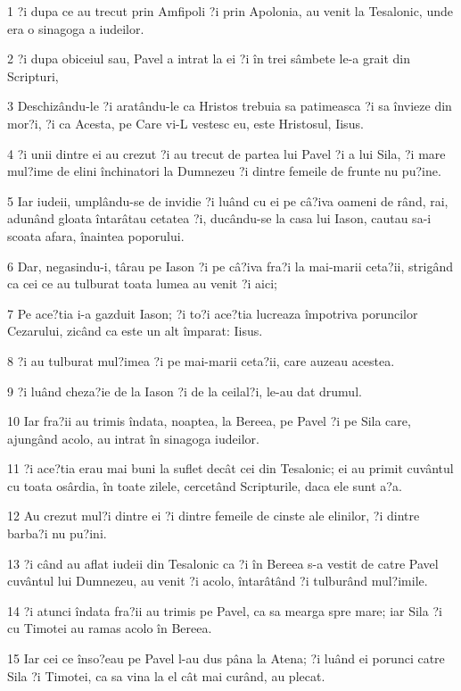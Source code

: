 \par 1 ?i dupa ce au trecut prin Amfipoli ?i prin Apolonia, au venit la Tesalonic, unde era o sinagoga a iudeilor.
\par 2 ?i dupa obiceiul sau, Pavel a intrat la ei ?i în trei sâmbete le-a grait din Scripturi,
\par 3 Deschizându-le ?i aratându-le ca Hristos trebuia sa patimeasca ?i sa învieze din mor?i, ?i ca Acesta, pe Care vi-L vestesc eu, este Hristosul, Iisus.
\par 4 ?i unii dintre ei au crezut ?i au trecut de partea lui Pavel ?i a lui Sila, ?i mare mul?ime de elini închinatori la Dumnezeu ?i dintre femeile de frunte nu pu?ine.
\par 5 Iar iudeii, umplându-se de invidie ?i luând cu ei pe câ?iva oameni de rând, rai, adunând gloata întarâtau cetatea ?i, ducându-se la casa lui Iason, cautau sa-i scoata afara, înaintea poporului.
\par 6 Dar, negasindu-i, târau pe Iason ?i pe câ?iva fra?i la mai-marii ceta?ii, strigând ca cei ce au tulburat toata lumea au venit ?i aici;
\par 7 Pe ace?tia i-a gazduit Iason; ?i to?i ace?tia lucreaza împotriva poruncilor Cezarului, zicând ca este un alt împarat: Iisus.
\par 8 ?i au tulburat mul?imea ?i pe mai-marii ceta?ii, care auzeau acestea.
\par 9 ?i luând cheza?ie de la Iason ?i de la ceilal?i, le-au dat drumul.
\par 10 Iar fra?ii au trimis îndata, noaptea, la Bereea, pe Pavel ?i pe Sila care, ajungând acolo, au intrat în sinagoga iudeilor.
\par 11 ?i ace?tia erau mai buni la suflet decât cei din Tesalonic; ei au primit cuvântul cu toata osârdia, în toate zilele, cercetând Scripturile, daca ele sunt a?a.
\par 12 Au crezut mul?i dintre ei ?i dintre femeile de cinste ale elinilor, ?i dintre barba?i nu pu?ini.
\par 13 ?i când au aflat iudeii din Tesalonic ca ?i în Bereea s-a vestit de catre Pavel cuvântul lui Dumnezeu, au venit ?i acolo, întarâtând ?i tulburând mul?imile.
\par 14 ?i atunci îndata fra?ii au trimis pe Pavel, ca sa mearga spre mare; iar Sila ?i cu Timotei au ramas acolo în Bereea.
\par 15 Iar cei ce înso?eau pe Pavel l-au dus pâna la Atena; ?i luând ei porunci catre Sila ?i Timotei, ca sa vina la el cât mai curând, au plecat.

